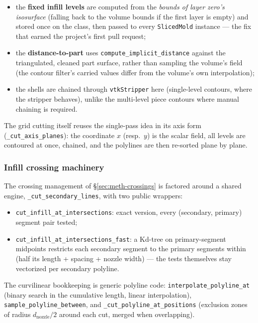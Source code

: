 \begin{itemize}
  \item the \textbf{fixed infill levels} are computed from the
        \emph{bounds of layer zero's isosurface} (falling back to the
        volume bounds if the first layer is empty) and stored once on
        the class, then passed to every \texttt{SlicedMold} instance
        --- the fix that earned the project's first pull request;
  \item the \textbf{distance-to-part} uses
        \texttt{compute\_implicit\_distance} against the triangulated,
        cleaned part surface, rather than sampling the volume's field
        (the contour filter's carried values differ from the volume's
        own interpolation);
  \item the shells are chained through \texttt{vtkStripper} here
        (single-level contours, where the stripper behaves), unlike
        the multi-level piece contours where manual chaining is
        required.
\end{itemize}

The grid cutting itself reuses the single-pass idea in its axis form
(\texttt{\_cut\_axis\_planes}): the coordinate
$x$ (resp.\ $y$) is the scalar field, all levels are contoured at once,
chained, and the polylines are then re-sorted plane by plane.

\subsubsection{Infill crossing machinery}

The crossing management of \S\ref{sec:meth-crossings} is factored
around a shared engine, \texttt{\_cut\_secondary\_lines}, with two
public wrappers:

\begin{itemize}
  \item \texttt{cut\_infill\_at\_intersections}: exact
        version, every (secondary, primary) segment pair tested;
  \item \texttt{cut\_infill\_at\_intersections\_fast}: a Kd-tree on
        primary-segment midpoints restricts each secondary segment to
        the primary segments within
        (half its length + spacing + nozzle width) --- the tests
        themselves stay vectorized per secondary polyline.
\end{itemize}

The curvilinear bookkeeping is generic polyline code:
\texttt{interpolate\_polyline\_at} (binary search in the cumulative
length, linear interpolation), \texttt{sample\_polyline\_between}, and
\texttt{\_cut\_polyline\_at\_positions} (exclusion zones of radius
$d_{\mathrm{nozzle}}/2$ around each cut, merged when overlapping).

